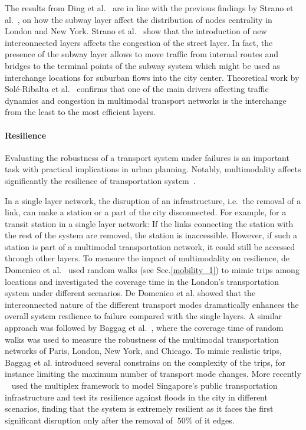 The results from Ding et al.~\cite{ding2018traffic} are in line with the previous findings by Strano et al.~\cite{strano2015features}, on how the subway layer affect the distribution of nodes centrality in London and New York. Strano et al.~\cite{strano2015features} show that the introduction of new interconnected layers affects the congestion of the street layer. In fact, the presence of the subway layer allows to move traffic from internal routes and bridges to the terminal points of the subway system which might be used as interchange locations for suburban flows into the city center. Theoretical work by Sol\'{e}-Ribalta et al.~\cite{sole-ribalta2016congestion} confirms that one of the main drivers affecting traffic dynamics and congestion in multimodal transport networks is the interchange from the least to the most efficient layers.

\paragraph*{Resilience}
Evaluating the robustness of a transport system under failures is an important task with practical implications in urban planning. Notably, multimodality affects significantly the resilience of transportation system~\cite{dedomenico2014interconnected}.

In a single layer network, the disruption of an infrastructure, i.e.~the removal of a link, can make a station or a part of the city disconnected. For example, for a transit station in a single layer network: If the links connecting the station with the rest of the system are removed, the station is inaccessible. However, if such a station is part of a multimodal transportation network, it could still be accessed through other layers. To measure the impact of multimodality on resilience, de Domenico et al.~\cite{dedomenico2014interconnected} used random walks (see Sec.\ref{mobility_1}) to mimic trips among locations and investigated the coverage time in the London's transportation system under different scenarios. De Domenico et al. showed that the interconnected nature of the different transport modes dramatically enhances the overall system resilience to failure compared with the single layers. A similar approach was followed by Baggag et al.~\cite{baggag2018resilience}, where the coverage time of random walks was used to measure the robustness of the multimodal transportation networks of Paris, London, New York, and Chicago. To mimic realistic trips, Baggag et al. introduced several constrains on the complexity of the trips, for instance limiting the maximum number of transport mode changes. More recently ~\cite{ferretti2019resilience} used the multiplex framework to model Singapore's public transportation infrastructure and test its resilience against floods in the city in different scenarios, finding that the system is extremely resilient as it faces the first significant disruption only after the removal of $~50\%$ of it edges.


